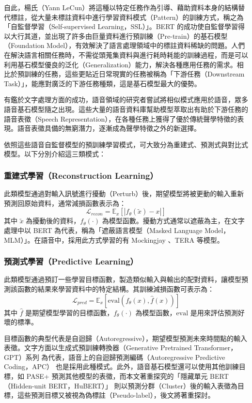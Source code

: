 自此，楊氏（Yann LeCun）將這種以特定任務作為引導、藉助資料本身的結構替代標註，從大量未標註資料中進行學習資料模式（Pattern）的訓練方式，稱之為「自監督學習（Self-supervised Learning，SSL）」。BERT 的成功使自監督學習得以大行其道，並出現了許多由巨量資料進行預訓練（Pre-train）的基石模型（Foundation Model），有效解決了語言處理領域中的標註資料稀缺的問題。人們在解決語言相關任務時，不需從頭蒐集資料與進行耗時耗能的訓練過程，而是可以利用基石模型優良的泛化（Generalization）能力，解決各種應用任務的需求。相比於預訓練的任務，這些更貼近日常現實的任務被稱為「下游任務（Downstream Task）」，能應對廣泛的下游任務種類，這是基石模型最大的優勢。

有鑑於文字處理方面的成功，語音領域的研究者嘗試將相似模式應用於語音，眾多語音基石模型隨之出現。這些大量的語音資料庫幫助模型萃取出有助於下游任務的語音表徵（Speech Representation），在各種任務上獲得了優於傳統聲學特徵的表現。語音表徵具備的無窮潛力，逐漸成為聲學特徵之外的新選擇。

依照這些語音自監督模型的預訓練學習模式，可大致分為重建式、預測式與對比式模型。以下分別介紹這三類模式：

\subsubsection{重建式學習（Reconstruction Learning）}

此類模型通過對輸入訊號進行擾動（Perturb）後，期望模型將被更動的輸入重新預測回原始資料，通常減損函數表示為：
$$\mathcal{L}_{recon} = \mathbb{E}_x[|f_\theta(\tilde{x}) - x|]$$
其中 $\tilde{x}$ 為擾動後的資料，$f_\theta(\cdot)$ 為模型函數。擾動方式通常以遮蔽為主，在文字處理中以 BERT 為代表，稱為「遮蔽語言模型（Masked Language Model，MLM）」。在語音中，採用此方式學習的有 Mockingjay \cite{liu_mockingjay_2019}、TERA \cite{t_tera_2021} 等模型。  %

\subsubsection{預測式學習（Predictive Learning）}

此類模型通過預訂一些學習目標函數，製造類似輸入與輸出的配對資料，讓模型預測該函數的結果來學習資料中的特定結構。其訓練減損函數可表示為：
$$\mathcal{L}_{pred} = \mathbb{E}_x[\text{eval}(f_\theta(x), \hat{f}(x))]$$
其中 $\hat{f}$ 是期望模型學習的目標函數，$f_\theta(\cdot)$ 為模型函數，$\text{eval}$ 是用來評估預測好壞的標準。

目標函數的典型代表是自迴歸（Autoregressive），期望模型預測未來時間點的輸入表徵。文字方面以生成式預訓練轉換器（Generative Pretrained Transformer，GPT）系列 \cite{radford_language_nodate, brown_language_2020}為代表，語音上的自迴歸預測編碼（Autoregressive Predictive Coding，APC） \cite{chung_generative_2020} 也是採用此種模式。此外，語音基石模型還可以使用其他訓練目標，如 PASE+ \cite{ravanelli_multi-task_2020} 預測其他模型的表徵，而本文著重探究的「隱藏單元 BERT（Hidden-unit BERT，HuBERT）」\cite{hsu_hubert_2021, hsu_hubert_2021-2} 則以預測分群（Cluster）後的輸入表徵為目標，這些預測目標又被視為偽標註（Pseudo-label），後文將著重探討。

